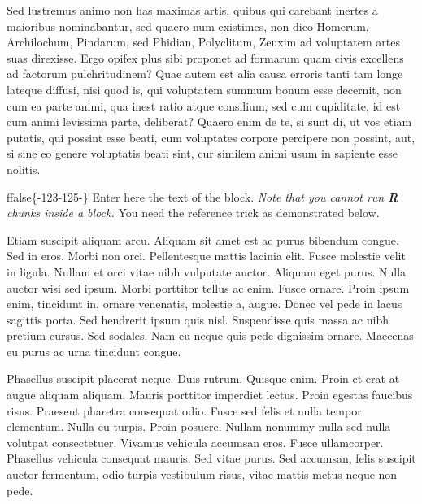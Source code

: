 \documentclass[twoside]{extreport}
\begin{document}
Sed lustremus animo non has maximas artis, quibus qui carebant inertes a
maioribus nominabantur, sed quaero num existimes, non dico Homerum,
Archilochum, Pindarum, sed Phidian, Polyclitum, Zeuxim ad voluptatem
artes suas direxisse. Ergo opifex plus sibi proponet ad formarum quam
civis excellens ad factorum pulchritudinem? Quae autem est alia causa
erroris tanti tam longe lateque diffusi, nisi quod is, qui voluptatem
summum bonum esse decernit, non cum ea parte animi, qua inest ratio
atque consilium, sed cum cupiditate, id est cum animi levissima parte,
deliberat? Quaero enim de te, si sunt di, ut vos etiam putatis, qui
possint esse beati, cum voluptates corpore percipere non possint, aut,
si sine eo genere voluptatis beati sint, cur similem animi usum in
sapiente esse nolitis.











\begin{alertblock}{}
ffalse\{-123-125-\}\fi{} Enter here the text of the block. \emph{Note
that you cannot run \textbf{R} chunks inside a block.} You need the
reference trick as demonstrated below.

Etiam suscipit aliquam arcu. Aliquam sit amet est ac
purus bibendum congue. Sed in eros. Morbi non orci. Pellentesque mattis
lacinia elit. Fusce molestie velit in ligula. Nullam et orci vitae nibh
vulputate auctor. Aliquam eget purus. Nulla auctor wisi sed ipsum. Morbi
porttitor tellus ac enim. Fusce ornare. Proin ipsum enim, tincidunt in,
ornare venenatis, molestie a, augue. Donec vel pede in lacus sagittis
porta. Sed hendrerit ipsum quis nisl. Suspendisse quis massa ac nibh
pretium cursus. Sed sodales. Nam eu neque quis pede dignissim ornare.
Maecenas eu purus ac urna tincidunt congue.
\end{alertblock}

Phasellus suscipit placerat neque. Duis rutrum. Quisque enim. Proin et
erat at augue aliquam aliquam. Mauris porttitor imperdiet lectus. Proin
egestas faucibus risus. Praesent pharetra consequat odio. Fusce sed
felis et nulla tempor elementum. Nulla eu turpis. Proin posuere. Nullam
nonummy nulla sed nulla volutpat consectetuer. Vivamus vehicula accumsan
eros. Fusce ullamcorper. Phasellus vehicula consequat mauris. Sed vitae
purus. Sed accumsan, felis suscipit auctor fermentum, odio turpis
vestibulum risus, vitae mattis metus neque non pede.
\end{document}
